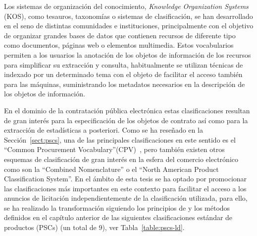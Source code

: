 Los sistemas de organización del conocimiento, \textit{Knowledge Organization Systems} (\gls{KOS}), como
tesauros, taxonomías o sistemas de clasificación, se han desarrollado en el seno de distintas comunidades e instituciones, 
principalmente con el objetivo de organizar grandes bases de datos que contienen recursos de diferente tipo como documentos, 
páginas web o elementos multimedia. Estos vocabularios permiten a los usuarios la anotación
de los objetos de información de los recursos para simplificar su extracción y consulta, habitualmente 
se utilizan técnicas de indexado por un determinado tema con el objeto de facilitar el acceso también para las máquinas, 
suministrando los metadatos necesarios en la descripción de los objetos de información.

En el dominio de la contratación pública electrónica estas clasificaciones resultan de gran 
interés para la especificación de los objetos de contrato así como para la extracción de 
estadísticas a posteriori. Como se ha reseñado en la Sección~\ref{sect:pscs}, una de las 
principales clasificaciones en este sentido es el ``Common Procurement Vocabulary''(\gls{CPV})~\cite{cpvguide}, 
pero también existen otros esquemas de clasificación de gran interés en la esfera del comercio 
electrónico como son la ``Combined Nomenclature'' o el ``North American Product Classification System''. 
En el ámbito de esta tesis se ha optado por promocionar las clasificaciones más importantes en este contexto 
para facilitar el acceso a los anuncios de licitación independientemente de la clasificación utilizada, para ello, 
se ha realizado la transformación siguiendo los principios de \linkeddata y los métodos definidos en el capítulo anterior de 
las siguientes clasificaciones estándar de productos (\gls{PSC}s) (un total de $9$), ver Tabla~\ref{table:pscs-ld}.

